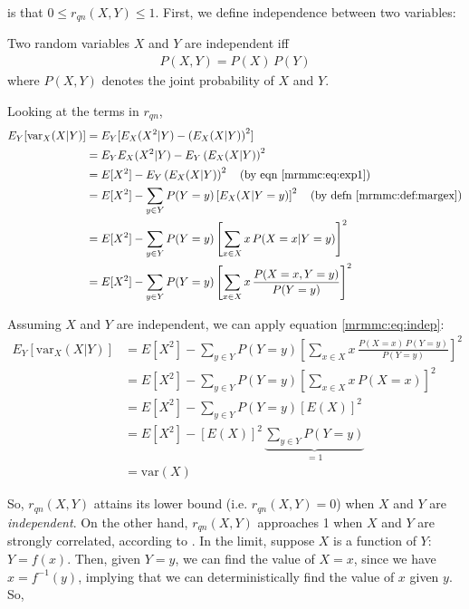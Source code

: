 \documentclass[12pt, twoside, a4paper]{report}
\def\var{\text{var}}
\begin{document}
is that $0 \leq r_{qn}(X, Y) \leq 1$. First, we define independence between two variables:\\

\begin{mydef}
Two random variables $X$ and $Y$ are independent iff
\begin{align}
P(X, Y) = P(X) \, P(Y) \label{mrmmc:eq:indep}
\end{align}
where $P(X, Y)$ denotes the joint probability of $X$ and $Y$.
\end{mydef}

Looking at the terms in $r_{qn}$,
\begin{align*}
E_Y[\var_X(X|Y)]
&= E_Y [E_X(X^2|Y)-\left( E_X(X|Y) \right)^2 ] \\
&= E_YE_X(X^2|Y) - E_Y\left( E_X(X|Y) \right)^2 \\
&= E[X^2] - E_Y\left( E_X(X|Y) \right)^2 \quad \text{(by eqn \ref{mrmmc:eq:exp1})} \\
&= E[X^2] - \sum_{y\in Y} P(Y=y) \left[ E_X(X|Y=y) \right]^2 \quad \text{(by defn \ref{mrmmc:def:margex})} \\
&= E[X^2] - \sum_{y\in Y} P(Y=y) \left[ \sum_{x \in X} x \, P(X=x|Y=y) \right]^2 \\
&= E[X^2] - \sum_{y\in Y} P(Y=y) \left[ \sum_{x \in X} x \, \frac{P(X=x, Y=y)}{P(Y=y)} \right]^2
\end{align*}

Assuming $X$ and $Y$ are independent, we can apply equation \ref{mrmmc:eq:indep}:
\begin{align*}
E_Y[\var_X(X|Y)]
&= E[X^2] - \sum_{y\in Y} P(Y=y) \left[ \sum_{x \in X} x \, \frac{P(X=x) \, P(Y=y)}{P(Y=y)} \right]^2 \\
&= E[X^2] - \sum_{y\in Y} P(Y=y) \left[ \sum_{x \in X} x \, P(X=x) \right]^2 \\
&= E[X^2] - \sum_{y\in Y} P(Y=y) \left[ E(X) \right]^2 \\
&= E[X^2] - \left[ E(X) \right]^2 \, \underbrace{\sum_{y\in Y} P(Y=y)}_{=1} \\
&= \var(X)
\end{align*}

So, $r_{qn}(X, Y)$ attains its lower bound (i.e. $r_{qn}(X, Y)=0$) when $X$ and $Y$ are \textit{independent}. On the other hand, $r_{qn}(X, Y)$ approaches 1 when $X$ and $Y$ are strongly correlated, according to \cite{RefWorks:187}. In the limit, suppose $X$ is a function of $Y$: $Y=f(x)$. Then, given $Y=y$, we can find the value of $X=x$, since we have $x=f^{-1}(y)$, implying that we can deterministically find the value of $x$ given $y$. So,
\end{document}
